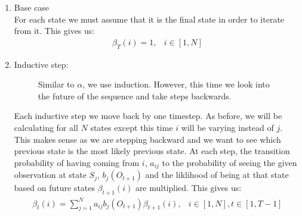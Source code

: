     \begin{enumerate}
        \item Base case \\
        For each state we must assume that it is the final state in order to iterate from it. This gives us:
        \begin{eqnarray}
            \beta_T(i) = 1, & i \in [1,N]
        \end{eqnarray}

        \item Inductive step:
        \begin{figure}
            \begin{center}
                \label{Hidden_Markov:Evaluation:Figure_Beta}
                \caption{Similar to $\alpha$, we use induction. However, this time we look into the future of the sequence and take steps backwards.}
            \end{center}
        \end{figure}

        Each inductive step we move back by one timestep. As before, we will be calculating for all $N$ states except this time $i$ will be varying instead of $j$. This makes sense as we are stepping backward and we want to see which previous state is the most likely previous state. At each step, the transition probability of having coming from $i$, $a_{ij}$ to the probability of seeing the given observation at state $S_j$, $b_j(O_{t+1})$ and the liklihood of being at that state based on future states $\beta_{t+1}(i)$ are multiplied. This gives us:
        \begin{eqnarray}
            \beta_{t}(i) = \sum_{j=1}^N a_{ij} b_j(O_{t+1}) \beta_{t+1}(i), & i \in [1,N], t \in [1,T-1]
        \end{eqnarray}
    \end{enumerate}



